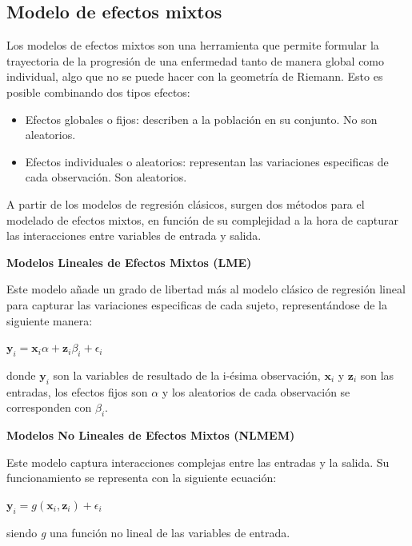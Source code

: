 	\subsection{Modelo de efectos mixtos}
	Los modelos de efectos mixtos son una herramienta que permite formular la trayectoria de la progresión de una enfermedad tanto de manera global como individual, algo que no se puede hacer con la geometría de Riemann. Esto es posible combinando dos tipos efectos:
	\begin{itemize}
		\item Efectos globales o fijos: describen a la población en su conjunto. No son aleatorios.
		\item Efectos individuales o aleatorios: representan las variaciones especificas de cada observación. Son aleatorios.
	\end{itemize}
	
	A partir de los modelos de regresión clásicos, surgen dos métodos para el modelado de efectos mixtos, en función de su complejidad a la hora de capturar las interacciones entre variables de entrada y salida.
	
	
	\begin{description}
		\item {\textbf{Modelos Lineales de Efectos Mixtos (LME)}}
		
		Este modelo añade un grado de libertad más al modelo clásico de regresión lineal para capturar las variaciones especificas de cada sujeto, representándose de la siguiente manera:\\
		\begin{center}
			$\textbf{y}_{i}=\textbf{x}_{i}\alpha+\textbf{z}_{i}\beta_{i}+\epsilon_{i}$
		\end{center}
		donde $\textbf{y}_{i}$ son la variables de resultado de la i-ésima observación, $\textbf{x}_{i}$ y $\textbf{z}_{i}$ son las entradas, los efectos fijos son $\alpha$ y los aleatorios de cada observación se corresponden con $\beta_{i}$.
		
		\item{\textbf{Modelos No Lineales de Efectos Mixtos (NLMEM)}}
		
		Este modelo captura interacciones complejas entre las entradas y la salida. Su funcionamiento se representa con la siguiente ecuación:
		\begin{center}
			$\textbf{y}_{i}=g(\textbf{x}_{i},\textbf{z}_{i})+\epsilon_{i}$
		\end{center}
		siendo \textit{g} una función no lineal de las variables de entrada.
	\end{description}
	

